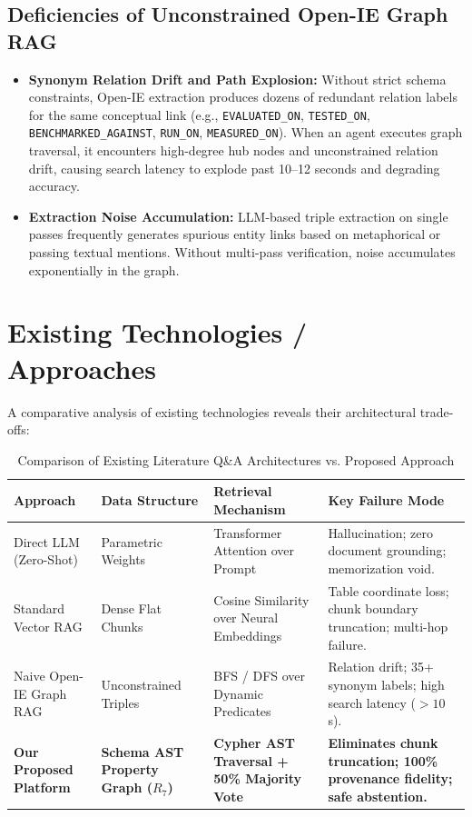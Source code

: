 \documentclass[12pt,a4paper,oneside]{report}
\begin{document}
\subsection{Deficiencies of Unconstrained Open-IE Graph RAG}
\begin{itemize}
    \item \textbf{Synonym Relation Drift and Path Explosion:} Without strict schema constraints, Open-IE extraction produces dozens of redundant relation labels for the same conceptual link (e.g., \texttt{EVALUATED\_ON}, \texttt{TESTED\_ON}, \texttt{BENCHMARKED\_AGAINST}, \texttt{RUN\_ON}, \texttt{MEASURED\_ON}). When an agent executes graph traversal, it encounters high-degree hub nodes and unconstrained relation drift, causing search latency to explode past 10–12 seconds and degrading accuracy.
    \item \textbf{Extraction Noise Accumulation:} LLM-based triple extraction on single passes frequently generates spurious entity links based on metaphorical or passing textual mentions. Without multi-pass verification, noise accumulates exponentially in the graph.
\end{itemize}

\section{Existing Technologies / Approaches}
A comparative analysis of existing technologies reveals their architectural trade-offs:
\begin{table}[h]
\centering
\caption{Comparison of Existing Literature Q\&A Architectures vs. Proposed Approach}
\label{tab:existing_tech_comp}
\small
\begin{tabular}{p{3.2cm}p{2.8cm}p{3.2cm}p{4.2cm}}
\toprule
\textbf{Approach} & \textbf{Data Structure} & \textbf{Retrieval Mechanism} & \textbf{Key Failure Mode} \\
\midrule
Direct LLM (Zero-Shot) & Parametric Weights & Transformer Attention over Prompt & Hallucination; zero document grounding; memorization void. \\
\midrule
Standard Vector RAG & Dense Flat Chunks & Cosine Similarity over Neural Embeddings & Table coordinate loss; chunk boundary truncation; multi-hop failure. \\
\midrule
Naive Open-IE Graph RAG & Unconstrained Triples & BFS / DFS over Dynamic Predicates & Relation drift; 35+ synonym labels; high search latency ($>10$s). \\
\midrule
\textbf{Our Proposed Platform} & \textbf{Schema AST Property Graph ($R_7$)} & \textbf{Cypher AST Traversal + 50\% Majority Vote} & \textbf{Eliminates chunk truncation; 100\% provenance fidelity; safe abstention.} \\
\bottomrule
\end{tabular}
\end{table}
\end{document}
